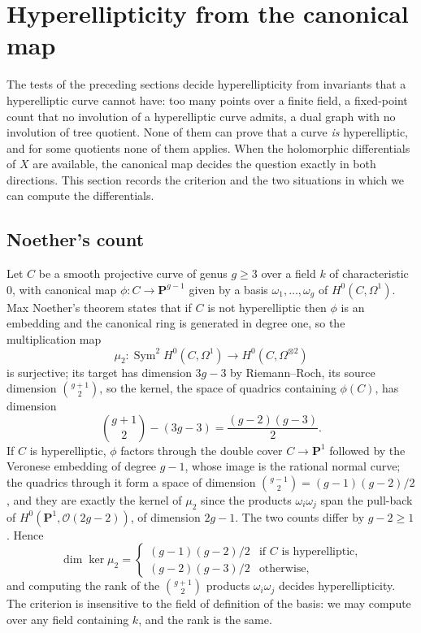 
\section{Hyperellipticity from the canonical map}\label{sec:canonicalquadrics}

The tests of the preceding sections decide hyperellipticity from invariants that a hyperelliptic
curve cannot have: too many points over a finite field, a fixed-point count that no involution of a
hyperelliptic curve admits, a dual graph with no involution of tree quotient. None of them can
prove that a curve \emph{is} hyperelliptic, and for some quotients none of them applies. When the
holomorphic differentials of $X$ are available, the canonical map decides the question exactly in
both directions. This section records the criterion and the two situations in which we can compute
the differentials.

\subsection{Noether's count}

Let $C$ be a smooth projective curve of genus $g \ge 3$ over a field $k$ of characteristic $0$,
with canonical map $\phi\colon C \to \mathbf{P}^{g-1}$ given by a basis $\omega_1,\dots,\omega_g$ of
$H^0(C,\Omega^1)$. Max Noether's theorem states that if $C$ is not hyperelliptic then $\phi$ is an
embedding and the canonical ring is generated in degree one, so the multiplication map
\[
  \mu_2\colon \operatorname{Sym}^2 H^0(C,\Omega^1) \longrightarrow H^0(C,\Omega^{\otimes 2})
\]
is surjective; its target has dimension $3g-3$ by Riemann--Roch, its source dimension
$\binom{g+1}{2}$, so the kernel, the space of quadrics containing $\phi(C)$, has dimension
\[
  \binom{g+1}{2} - (3g-3) = \frac{(g-2)(g-3)}{2}.
\]
If $C$ is hyperelliptic, $\phi$ factors through the double cover $C \to \mathbf{P}^1$ followed by the
Veronese embedding of degree $g-1$, whose image is the rational normal curve; the quadrics through
it form a space of dimension $\binom{g-1}{2} = (g-1)(g-2)/2$, and they are exactly the kernel of
$\mu_2$ since the products $\omega_i\omega_j$ span the pull-back of
$H^0(\mathbf{P}^1,\mathcal{O}(2g-2))$, of dimension $2g-1$. The two counts differ by $g-2 \ge 1$.
Hence
\[
  \dim \ker \mu_2 =
  \begin{cases}
    (g-1)(g-2)/2 & \text{if $C$ is hyperelliptic,}\\
    (g-2)(g-3)/2 & \text{otherwise,}
  \end{cases}
\]
and computing the rank of the $\binom{g+1}{2}$ products $\omega_i\omega_j$ decides hyperellipticity.
The criterion is insensitive to the field of definition of the basis: we may compute over any field
containing $k$, and the rank is the same.

